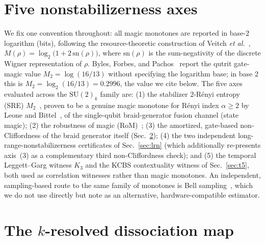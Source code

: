 \documentclass[aps,pra,twocolumn,superscriptaddress,longbibliography,floatfix,nofootinbib]{revtex4-2}
\begin{document}
\section{Five nonstabilizerness axes}
\label{sec:axes}

We fix one convention throughout: all magic monotones are reported in
base-2 logarithm (bits), following the resource-theoretic construction
of Veitch \emph{et al.}~\cite{VeitchEtAl2014},
$M(\rho)=\log_2\bigl(1+2\,\mathrm{sn}(\rho)\bigr)$, where
$\mathrm{sn}(\rho)$ is the sum-negativity of the discrete Wigner
representation of $\rho$. Byles, Forbes, and
Pachos~\cite{Byles2024} report the qutrit gate-magic value
$M_2=\log(16/13)$ without specifying the logarithm base; in base 2
this is $M_2=\log_2(16/13)=0.2996$, the value we cite below. The five
axes evaluated across the $\mathrm{SU}(2)_k$ family are: (1) the
stabilizer $2$-Rényi entropy (SRE) $M_2$~\cite{LeoneOlivieroHamma2022},
proven to be a genuine magic monotone for Rényi index $\alpha\ge2$ by
Leone and Bittel~\cite{LeoneBittel2024}, of the single-qubit
braid-generator fusion channel (state magic); (2) the robustness of
magic (RoM)~\cite{HowardCampbell2017}; (3) the amortized, gate-based
non-Cliffordness of the braid generator itself (Sec.~\ref{sec:map});
(4) the two independent long-range-nonstabilizerness certificates of
Sec.~\ref{sec:lrn} (which additionally re-presents axis~(3) as a
complementary third non-Cliffordness check); and (5) the temporal
Leggett--Garg witness $K_3$
and the KCBS contextuality witness of Sec.~\ref{sec:t5}, both used as
correlation witnesses rather than magic monotones. An independent,
sampling-based route to the same family of monotones is Bell
sampling~\cite{HaugKim2023}, which we do not use directly but note as
an alternative, hardware-compatible estimator.

\section{The $k$-resolved dissociation map}
\label{sec:map}
\end{document}
